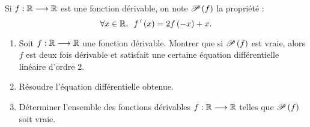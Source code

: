 \begin{exo}[Exercice 17]
Si \(f:\R\to\R\) est une fonction dérivable, on note \(\P{f}\) la propriété : \[\quantifs{\forall x\in\R}f\prim\paren{x}=2f\paren{-x}+x.\]

\begin{enumerate}
    \item Soit \(f:\R\to\R\) une fonction dérivable. Montrer que si \(\P{f}\) est vraie, alors \(f\) est deux fois dérivable et satisfait une certaine équation différentielle linéaire d'ordre 2. \\
    \item Résoudre l'équation différentielle obtenue. \\
    \item Déterminer l'ensemble des fonctions dérivables \(f:\R\to\R\) telles que \(\P{f}\) soit vraie.
\end{enumerate}
\end{exo}

\begin{corr}
\end{corr}